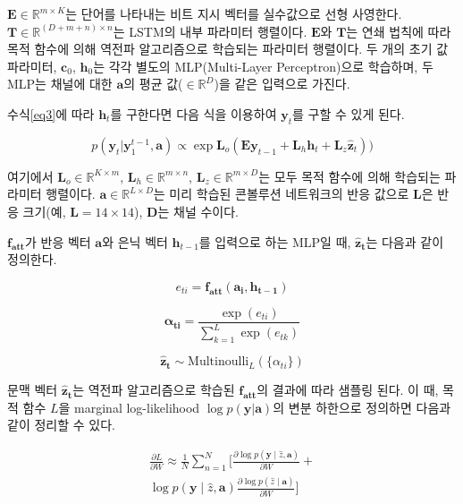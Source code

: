 \documentclass{kcc}
\newcommand{\vy}[0]{\mathbf{y}}
\newcommand{\va}[0]{\mathbf{a}}
\newcommand{\vh}[0]{\mathbf{h}}
\newcommand{\vz}[0]{\mathbf{z}}
\newcommand{\sa}[0]{\mathbf{a}}
\newcommand{\mE}[0]{\mathbf{E}}
\newcommand{\mL}[0]{\mathbf{L}}
\newcommand{\mT}[0]{\mathbf{T}}
\begin{document}
$\mE \in \mathbb{R}^{m \times K}$는 단어를 나타내는 비트 지시 벡터를 실수값으로 선형 사영한다.  $\mT \in \mathbb{R}^{(D+m+n) \times n}$는 LSTM의 내부 파라미터 행렬이다. $\mE$와 $\mT$는 연쇄 법칙에 따라 목적 함수에 의해 역전파 알고리즘으로 학습되는 파라미터 행렬이다. 두 개의 초기 값 파라미터, $\mathbf{c}_0$, $\mathbf{h}_0$는 각각 별도의 MLP(Multi-Layer Perceptron)으로 학습하며, 두 MLP는 채널에 대한 $\mathbf{a}$의 평균 값($\in \mathbb{R}^{D}$)을 같은 입력으로 가진다.

수식\ref{eq3}에 따라 $\vh_t$를 구한다면 다음 식을 이용하여 $\vy_t$를 구할 수 있게 된다.

\begin{equation}
p(\vy_t|\vy^{t-1}_1,\sa) \propto \exp{\mL_o(\mE\vy_{t-1} + \mL_{h}\vh_t + \mL_{z}\hat{\vz}_t))}
\end{equation}

여기에서 $\mathbf{L}_{o} \in \mathbb{R}^{K \times m}$, $\mathbf{L}_{h} \in \mathbb{R}^{m \times n}$, $\mathbf{L}_{z} \in \mathbb{R}^{m \times D}$는 모두 목적 함수에 의해 학습되는 파라미터 행렬이다. $\mathbf{a} \in \mathbb{R}^{L \times D}$는 미리 학습된 콘볼루션 네트워크의 반응 값으로 $\mathbf{L}$은 반응 크기(예, $\mathbf{L} = 14 \times 14$), $\mathbf{D}$는 채널 수이다. 

$\mathbf{f_{att}}$가 반응 벡터 $\va$와 은닉 벡터 $\vh_{t-1}$를 입력으로 하는  MLP일 때, $\mathbf{\hat{z}_t}$는 다음과 같이 정의한다.

\begin{equation}
e_{ti} = \mathbf{f_{att}}(\mathbf{a_i}, \mathbf{h_{t-1}})
\end{equation}

\begin{equation}
\mathbf{\alpha_{ti}} = \frac{\exp(e_{ti})}{\sum^{L}_{k=1}\exp(e_{tk})}
\end{equation}

\begin{equation}
\mathbf{\hat{z}_t} \sim \text{Multinoulli}_L(\{\alpha_{ti}\})
\end{equation}

문맥 벡터 $\mathbf{\hat{z}_t}$는 역전파 알고리즘으로 학습된 $\mathbf{f_{att}}$의 결과에 따라 샘플링 된다. 이 때, 목적 함수 $\mathit{L}$을 marginal log-likelihood $\log p(\mathbf{y}|\mathbf{a})$의 변분 하한으로 정의하면 다음과 같이 정리할 수 있다\cite{Xu2015}.

\begin{align} 
 \frac{\partial L}{\partial W} \approx \frac{1}{N} \sum_{n=1}^{N} \bigg[ \frac{\partial \log p(\vy \mid \hat{z}, \va)}{\partial W} +  \\
                                \log p(\vy \mid \hat{z}, \va) \frac{\partial \log p(\hat{z} \mid \va)}{\partial W} \bigg]
\end{align} 
\end{document}
